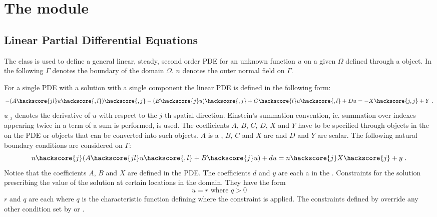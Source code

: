 %
%


\chapter{The module \linearPDEs}



\section{Linear Partial Differential Equations}
\label{SEC LinearPDE}

The \LinearPDE class is used to define a general linear, steady, second order PDE
for an unknown function $u$ on a given $\Omega$ defined through a \Domain object.
In the following $\Gamma$ denotes the boundary of the domain $\Omega$. $n$ denotes
the outer normal field on $\Gamma$.

For a single PDE with a solution with a single component the linear PDE is defined in the
following form:
\begin{equation}\label{LINEARPDE.SINGLE.1}
-(A\hackscore{jl} u\hackscore{,l})\hackscore{,j}-(B\hackscore{j} u)\hackscore{,j}+C\hackscore{l} u\hackscore{,l}+D u =-X\hackscore{j,j}+Y \; .
\end{equation}
$u_{,j}$ denotes the derivative of $u$ with respect to the $j$-th spatial direction. Einstein's summation convention, ie. summation over indexes appearing twice in a term of a sum is performed, is used.
The coefficients $A$, $B$, $C$, $D$, $X$ and $Y$ have to be specified through \Data objects in the
\Function on the PDE or objects that can be converted into such \Data objects.
$A$ is a \RankTwo, $B$, $C$ and $X$ are \RankOne and $D$ and $Y$ are scalar.
The following natural
boundary conditions are considered  on $\Gamma$:
\begin{equation}\label{LINEARPDE.SINGLE.2}
n\hackscore{j}(A\hackscore{jl} u\hackscore{,l}+B\hackscore{j} u)+d u=n\hackscore{j}X\hackscore{j} + y  \;.
\end{equation}
Notice that the coefficients $A$, $B$ and $X$ are defined in the PDE. The coefficients $d$ and $y$ are
each a \Scalar in the \FunctionOnBoundary.  Constraints  for the solution prescribing the value of the
solution at certain locations in the domain. They have the form
\begin{equation}\label{LINEARPDE.SINGLE.3}
u=r \mbox{ where } q>0
\end{equation}
$r$ and $q$ are each \Scalar where $q$ is the characteristic function
 defining where the constraint is applied.
The constraints defined by  override any other condition set by 
or .

